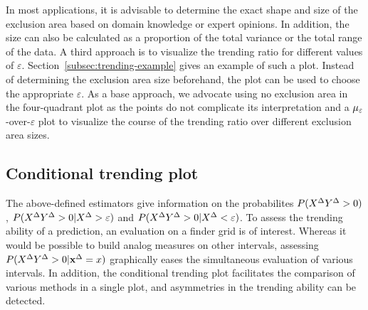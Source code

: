 In most applications, it is advisable to determine the exact shape and size of the exclusion area based on domain knowledge or expert opinions.
In addition, the size can also be calculated as a proportion of the total variance or the total range of the data.
A third approach is to visualize the trending ratio for different values of $\varepsilon$.
Section~\ref{subsec:trending-example} gives an example of such a plot.
Instead of determining the exclusion area size beforehand, the plot can be used to choose the appropriate $\varepsilon$.
As a base approach, we advocate using no exclusion area in the four-quadrant plot as the points do not complicate its interpretation and a $\mu_{\varepsilon}$-over-$\varepsilon$ plot to visualize the course of the trending ratio over different exclusion area sizes.


\subsection{Conditional trending plot}\label{subsec:trending-cond-prob}
The above-defined estimators give information on the probabilites $P(X^{\Delta} Y^{\Delta} > 0)$, $P(X^{\Delta} Y^{\Delta} > 0 | X^{\Delta} > \varepsilon)$ and $P(X^{\Delta} Y^{\Delta} > 0 | X^{\Delta} < \varepsilon)$.
To assess the trending ability of a prediction, an evaluation on a finder grid is of interest.
Whereas it would be possible to build analog measures on other intervals, assessing $P(X^{\Delta} Y^{\Delta} > 0 | \mathbf{x}^{\Delta} = x)$ graphically eases the simultaneous evaluation of various intervals.
In addition, the conditional trending plot facilitates the comparison of various methods in a single plot, and asymmetries in the trending ability can be detected.

